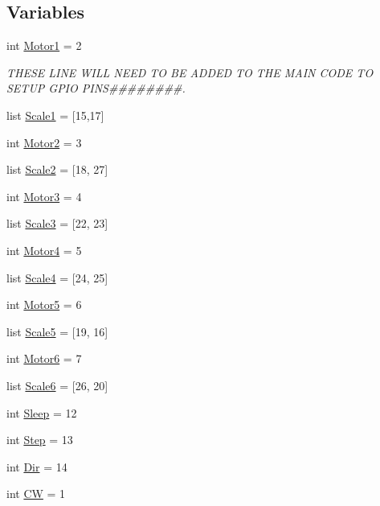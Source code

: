 \subsection*{Variables}
\begin{DoxyCompactItemize}
\item 
int \hyperlink{namespaceapp_a52e9545d13acb505f0dfe6a0f8a9ead5}{Motor1} = 2
\begin{DoxyCompactList}\small\item\em T\+H\+E\+SE L\+I\+NE W\+I\+LL N\+E\+ED TO BE A\+D\+D\+ED TO T\+HE M\+A\+IN C\+O\+DE TO S\+E\+T\+UP G\+P\+IO P\+I\+NS\#\#\#\#\#\#\#\#. \end{DoxyCompactList}\item 
list \hyperlink{namespaceapp_a97be8fdc0c27a5c7c9e902cbaa6d457d}{Scale1} = \mbox{[}15,17\mbox{]}
\item 
int \hyperlink{namespaceapp_a2d3780102500a6c8338843256acb072e}{Motor2} = 3
\item 
list \hyperlink{namespaceapp_a932350a6d6a58d6b640a47acc0331c02}{Scale2} = \mbox{[}18, 27\mbox{]}
\item 
int \hyperlink{namespaceapp_a9a249bef7b328713c5499a1ba8624b6c}{Motor3} = 4
\item 
list \hyperlink{namespaceapp_a59887e5f76ff2d0e764906131b09474e}{Scale3} = \mbox{[}22, 23\mbox{]}
\item 
int \hyperlink{namespaceapp_ae7f2a515528b9ae1ca2ef72c80b44bc0}{Motor4} = 5
\item 
list \hyperlink{namespaceapp_af9925deb9a0ad9408e7edba1245636c7}{Scale4} = \mbox{[}24, 25\mbox{]}
\item 
int \hyperlink{namespaceapp_a41d12b4f17d0237187a159d9b29a170e}{Motor5} = 6
\item 
list \hyperlink{namespaceapp_a2720eacb670dfc3c0577efc934271399}{Scale5} = \mbox{[}19, 16\mbox{]}
\item 
int \hyperlink{namespaceapp_a76b0edea929abf9452e693fd7051aee7}{Motor6} = 7
\item 
list \hyperlink{namespaceapp_ab361bccad49e31ae1453730280b2c95d}{Scale6} = \mbox{[}26, 20\mbox{]}
\item 
int \hyperlink{namespaceapp_ad593cd57e8aaea1c92131301c1cb8ad8}{Sleep} = 12
\item 
int \hyperlink{namespaceapp_a3ffaf6f881d8a870b387a86c47a7be4b}{Step} = 13
\item 
int \hyperlink{namespaceapp_ab92eea5047d03aea4bfe41d8cb41c94d}{Dir} = 14
\item 
int \hyperlink{namespaceapp_a2c043a638a93be367af1ab77bbcd16dc}{CW} = 1

\end{DoxyCompactItemize}
